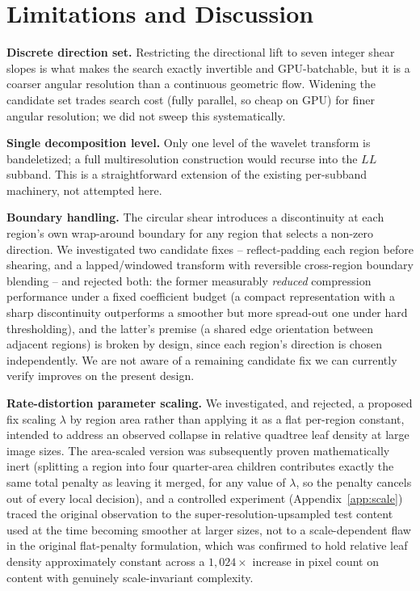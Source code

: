 \documentclass[11pt]{article}
\begin{document}
\section{Limitations and Discussion}
\label{sec:limitations}

\textbf{Discrete direction set.} Restricting the directional lift to seven
integer shear slopes is what makes the search exactly invertible and
GPU-batchable, but it is a coarser angular resolution than a continuous
geometric flow. Widening the candidate set trades search cost (fully
parallel, so cheap on GPU) for finer angular resolution; we did not sweep
this systematically.

\textbf{Single decomposition level.} Only one level of the wavelet
transform is bandeletized; a full multiresolution construction would
recurse into the $LL$ subband. This is a straightforward extension of the
existing per-subband machinery, not attempted here.

\textbf{Boundary handling.} The circular shear introduces a discontinuity
at each region's own wrap-around boundary for any region that selects a
non-zero direction. We investigated two candidate fixes -- reflect-padding
each region before shearing, and a lapped/windowed transform with reversible
cross-region boundary blending -- and rejected both: the former measurably
\emph{reduced} compression performance under a fixed coefficient budget (a
compact representation with a sharp discontinuity outperforms a smoother
but more spread-out one under hard thresholding), and the latter's premise
(a shared edge orientation between adjacent regions) is broken by design,
since each region's direction is chosen independently. We are not aware of
a remaining candidate fix we can currently verify improves on the present
design.

\textbf{Rate-distortion parameter scaling.} We investigated, and rejected, a
proposed fix scaling $\lambda$ by region area rather than applying it as a
flat per-region constant, intended to address an observed collapse in
relative quadtree leaf density at large image sizes. The area-scaled
version was subsequently proven mathematically inert (splitting a region
into four quarter-area children contributes exactly the same total penalty
as leaving it merged, for any value of $\lambda$, so the penalty cancels out
of every local decision), and a controlled experiment
(Appendix~\ref{app:scale}) traced the original observation to the
super-resolution-upsampled test content used at the time becoming smoother
at larger sizes, not to a scale-dependent flaw in the original flat-penalty
formulation, which was confirmed to hold relative leaf density
approximately constant across a $1{,}024\times$ increase in pixel count
on content with genuinely scale-invariant complexity.
\end{document}
